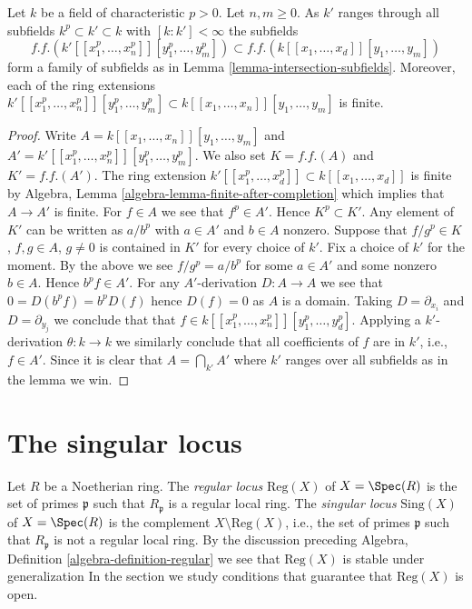 \begin{lemma}
\label{lemma-power-series-ring-subfields}
Let $k$ be a field of characteristic $p > 0$. Let $n, m \geq 0$.
As $k'$ ranges through all subfields $k^p \subset k' \subset k$
with $[k : k'] < \infty$ the subfields
$$
f.f.(k'[[x_1^p, \ldots, x_n^p]][y_1^p, \ldots, y_m^p])
\subset
f.f.(k[[x_1, \ldots, x_d]][y_1, \ldots, y_m])
$$
form a family of subfields as in Lemma \ref{lemma-intersection-subfields}.
Moreover, each of the ring extensions
$k'[[x_1^p, \ldots, x_n^p]][y_1^p, \ldots, y_m^p] \subset
k[[x_1, \ldots, x_n]][y_1, \ldots, y_m]$ is finite.
\end{lemma}

\begin{proof}
Write $A = k[[x_1, \ldots, x_n]][y_1, \ldots, y_m]$
and $A' = k'[[x_1^p, \ldots, x_n^p]][y_1^p, \ldots, y_m^p]$.
We also set $K = f.f.(A)$ and $K' = f.f.(A')$. The ring extension
$k'[[x_1^p, \ldots, x_d^p]] \subset k[[x_1, \ldots, x_d]]$ is finite
by Algebra, Lemma \ref{algebra-lemma-finite-after-completion}
which implies that $A \to A'$ is finite.
For $f \in A$ we see that $f^p \in A'$. Hence $K^p \subset K'$.
Any element of $K'$ can be written as $a/b^p$ with $a \in A'$ and $b \in A$
nonzero. Suppose that $f/g^p \in K$, $f, g \in A$, $g \not = 0$
is contained in $K'$ for every choice of $k'$.
Fix a choice of $k'$ for the moment. By the above we see
$f/g^p = a/b^p$ for some $a \in A'$ and some nonzero $b \in A$.
Hence $b^p f \in A'$. For any $A'$-derivation $D : A \to A$ we see
that $0 = D(b^pf) = b^p D(f)$ hence $D(f) = 0$ as $A$ is a domain.
Taking $D = \partial_{x_i}$ and $D = \partial_{y_j}$ we conclude that
that $f \in k[[x_1^p, \ldots, x_n^p]][y_1^p, \ldots, y_d^p]$.
Applying a $k'$-derivation $\theta : k \to k$
we similarly conclude that all coefficients of $f$ are in $k'$, i.e.,
$f \in A'$. Since it is clear that
$A = \bigcap\nolimits_{k'} A'$ where $k'$ ranges over all subfields
as in the lemma we win.
\end{proof}





\section{The singular locus}
\label{section-singular-locus}

\noindent
Let $R$ be a Noetherian ring. The {\it regular locus} $\text{Reg}(X)$
of $X = \Spec(R)$ is the set of primes $\mathfrak p$ such that
$R_\mathfrak p$ is a regular local ring. The {\it singular locus}
$\text{Sing}(X)$ of $X = \Spec(R)$ is the complement
$X \setminus \text{Reg}(X)$, i.e., the set of primes $\mathfrak p$ such that
$R_\mathfrak p$ is not a regular local ring. By the discussion preceding
Algebra, Definition \ref{algebra-definition-regular}
we see that $\text{Reg}(X)$ is stable under generalization
In the section we study conditions that guarantee that $\text{Reg}(X)$
is open.

